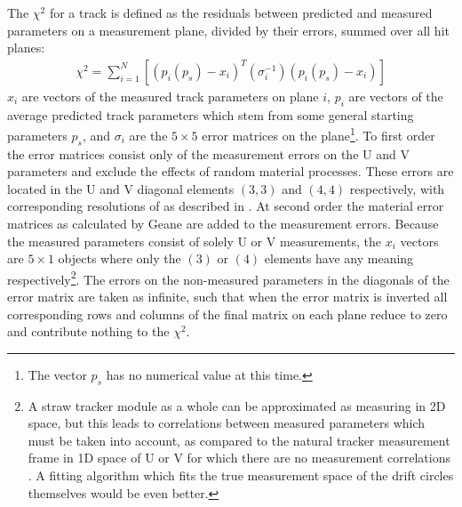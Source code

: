 The $\chi^{2}$ for a track is defined as the residuals between predicted and measured parameters on a measurement plane, divided by their errors, summed over all hit planes:
    \begin{align} \label{eq:chi2sum}
        \chi^2 = \sum_{i=1}^{N} [(p_{i}(p_{s})-x_{i})^{T} (\sigma_{i}^{-1}) (p_{i}(p_{s})-x_{i})]
    \end{align}
$x_{i}$ are vectors of the measured track parameters on plane $i$, $p_{i}$ are vectors of the average predicted track parameters which stem from some general starting parameters $p_{s}$, and $\sigma_{i}$ are the $5 \times 5$ error matrices on the plane\footnote{The vector $p_{s}$ has no numerical value at this time.}. To first order the error matrices consist only of the measurement errors on the U and V parameters and exclude the effects of random material processes. These errors are located in the U and V diagonal elements $(3,3)$ and $(4,4)$ respectively, with corresponding resolutions of  as described in . At second order the material error matrices as calculated by Geane are added to the measurement errors. Because the measured parameters consist of solely U or V measurements, the $x_{i}$ vectors are $5 \times 1$ objects where only the $(3)$ or $(4)$ elements have any meaning respectively\footnote{A straw tracker module as a whole can be approximated as measuring in 2D space, but this leads to correlations between measured parameters which must be taken into account, as compared to the natural tracker measurement frame in 1D space of U or V for which there are no measurement correlations \cite{UVcorrelations}. A fitting algorithm which fits the true measurement space of the drift circles themselves would be even better.}. The errors on the non-measured parameters in the diagonals of the error matrix are taken as infinite, such that when the error matrix is inverted all corresponding rows and columns of the final matrix on each plane reduce to zero and contribute nothing to the $\chi^{2}$.


